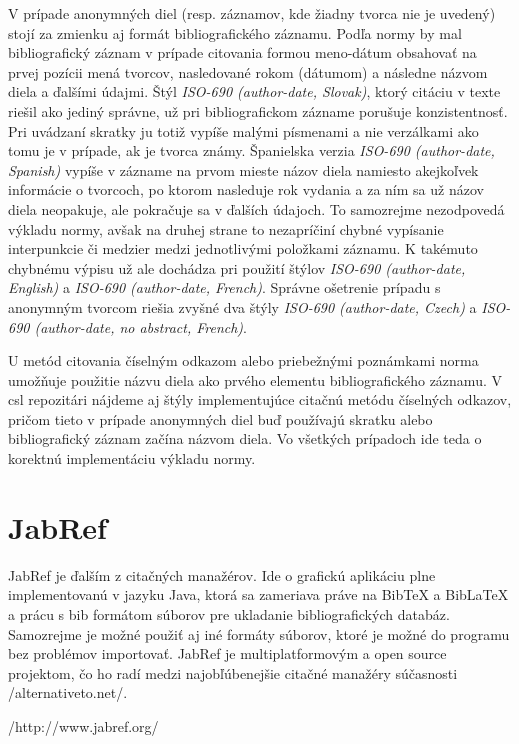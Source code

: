 \documentclass{fithesis3}
\begin{document}
	V prípade anonymných diel (resp. záznamov, kde žiadny tvorca nie je uvedený) stojí za zmienku aj formát bibliografického záznamu. Podľa normy by mal bibliografický záznam v prípade citovania formou meno-dátum obsahovať na prvej pozícii mená tvorcov, nasledované rokom (dátumom) a následne názvom diela a ďalšími údajmi. Štýl \textit{ISO-690 (author-date, Slovak)}, ktorý citáciu v texte riešil ako jediný správne, už pri bibliografickom zázname porušuje konzistentnosť. Pri uvádzaní skratky  ju totiž vypíše malými písmenami a nie verzálkami ako tomu je v prípade, ak je tvorca známy. Španielska verzia \textit{ISO-690 (author-date, Spanish)} vypíše v zázname na prvom mieste názov diela namiesto akejkoľvek informácie o tvorcoch, po ktorom nasleduje rok vydania a za ním sa už názov diela neopakuje, ale pokračuje sa v ďalších údajoch. To samozrejme nezodpovedá výkladu normy, avšak na druhej strane to nezapríčiní chybné vypísanie interpunkcie či medzier medzi jednotlivými položkami záznamu. K takémuto chybnému výpisu už ale dochádza pri použití štýlov \textit{ISO-690 (author-date, English)} a \textit{ISO-690 (author-date, French)}. Správne ošetrenie prípadu s anonymným tvorcom riešia zvyšné dva štýly \textit{ISO-690 (author-date, Czech)} a \textit{ISO-690 (author-date, no abstract, French)}.
	
	U metód citovania číselným odkazom alebo priebežnými poznámkami norma umožňuje použitie názvu diela ako prvého elementu bibliografického záznamu. V csl repozitári nájdeme aj štýly implementujúce citačnú metódu číselných odkazov, pričom tieto v prípade anonymných diel buď používajú skratku  alebo bibliografický záznam začína názvom diela. Vo všetkých prípadoch ide teda o korektnú implementáciu výkladu normy.
	
	\section{JabRef}
	
	JabRef je ďalším z citačných manažérov. Ide o grafickú aplikáciu plne implementovanú v jazyku Java, ktorá sa zameriava práve na BibTeX a BibLaTeX a prácu s bib formátom súborov pre ukladanie bibliografických databáz. Samozrejme je možné použiť aj iné formáty súborov, ktoré je možné do programu bez problémov importovať. JabRef je multiplatformovým a open source projektom, čo ho radí medzi najobľúbenejšie citačné manažéry súčasnosti /alternativeto.net/.
	
	/http://www.jabref.org/
	
\end{document}
